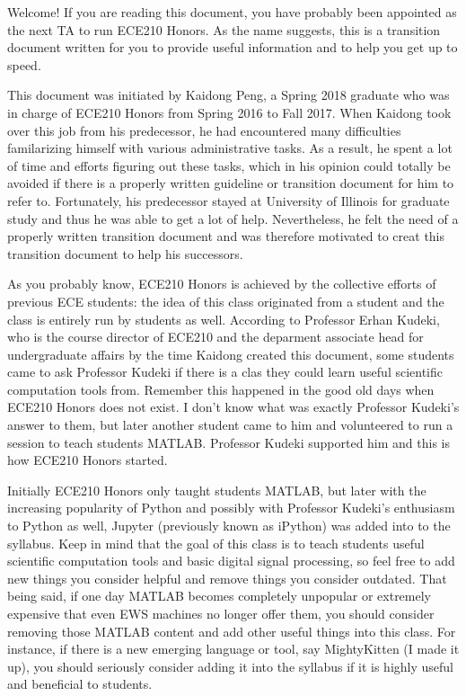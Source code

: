 Welcome! If you are reading this document, you have probably been appointed as the next TA to run ECE210 Honors. As the name suggests, this is a transition document written for you to provide useful information and to help you get up to speed.

This document was initiated by Kaidong Peng, a Spring 2018 graduate who was in charge of ECE210 Honors from Spring 2016 to Fall 2017. When Kaidong took over this job from his predecessor, he had encountered many difficulties familarizing himself with various administrative tasks. As a result, he spent a lot of time and efforts figuring out these tasks, which in his opinion could totally be avoided if there is a properly written guideline or transition document for him to refer to. Fortunately, his predecessor stayed at University of Illinois for graduate study and thus he was able to get a lot of help. Nevertheless, he felt the need of a properly written transition document and was therefore motivated to creat this transition document to help his successors.

As you probably know, ECE210 Honors is achieved by the collective efforts of previous ECE students: the idea of this class originated from a student and the class is entirely run by students as well. According to Professor Erhan Kudeki, who is the course director of ECE210 and the deparment associate head for undergraduate affairs by the time Kaidong created this document, some students came to ask Professor Kudeki if there is a clas they could learn useful scientific computation tools from. Remember this happened in the good old days when ECE210 Honors does not exist. I don't know what was exactly Professor Kudeki\rq s answer to them, but later another student came to him and volunteered to run a session to teach students MATLAB. Professor Kudeki supported him and this is how ECE210 Honors started.

Initially ECE210 Honors only taught students MATLAB, but later with the increasing popularity of Python and possibly with Professor Kudeki\rq s enthusiasm to Python as well, Jupyter (previously known as iPython) was added into to the syllabus. Keep in mind that the goal of this class is to teach students useful scientific computation tools and basic digital signal processing, so feel free to add new things you consider helpful and remove things you consider outdated. That being said, if one day MATLAB becomes completely unpopular or extremely expensive that even EWS machines no longer offer them, you should consider removing those MATLAB content and add other useful things into this class. For instance, if there is a new emerging language or tool, say MightyKitten (I made it up), you should seriously consider adding it into the syllabus if it is highly useful and beneficial to students.

